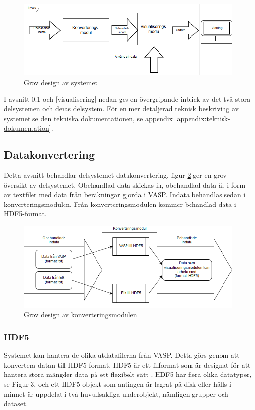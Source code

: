 \documentclass[a4paper,12pt]{article}
\begin{document}
\begin{figure}[H]
	\centering
	\includegraphics[scale=0.55]{grov-skiss.png}
	\caption{Grov design av systemet}
	\label{fig:grov-skiss}
\end{figure}

I avsnitt \ref{datakonvertering} och \ref{visualisering} nedan ges en övergripande inblick av det två stora delsystemen och deras delsystem. För en mer detaljerad teknisk beskriving av systemet se den tekniska dokumentationen, se appendix \ref{appendix:teknisk-dokumentation}.

\subsection{Datakonvertering}
\label{datakonvertering}
Detta avsnitt behandlar delsystemet datakonvertering, figur \ref{fig:konverteringdetalj} ger en grov översikt av delsystemet. Obehandlad data skickas in, obehandlad data är i form av textfiler med data från beräkningar gjorda i VASP.%
Indata behandlas sedan i konverteringsmodulen. Från konverteringsmodulen kommer behandlad data i HDF5-format.

\begin{figure}[H]
	\centering
	\includegraphics[scale=0.55]{konverteringdetalj.png}
	\caption{Grov design av konverteringsmodulen}
	\label{fig:konverteringdetalj}
\end{figure}

\subsubsection{HDF5}
Systemet kan hantera de olika utdatafilerna från VASP.%
Detta görs genom att konvertera datan till HDF5-format.
HDF5 är ett filformat som är designat för att hantera stora mängder data på ett flexibelt sätt \cite{hdf5}.
HDF5 har flera olika datatyper, se Figur 3, och ett HDF5-objekt som antingen är lagrat på disk eller hålls i minnet är uppdelat i två huvudsakliga underobjekt, nämligen grupper och dataset.
\end{document}
